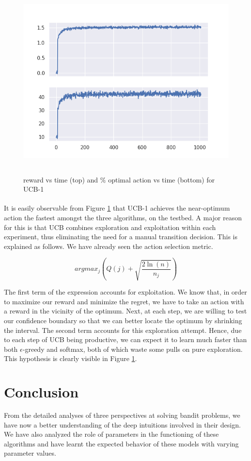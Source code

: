 \documentclass[12pt]{extarticle}
\begin{document}
\begin{figure}[H]
	\includegraphics[width=\textwidth, height=10cm]{ucb-1.png}
	\caption{reward vs time (top) and $\%$ optimal action vs time (bottom) for UCB-1}
	\label{fig:ucb-1}
\end{figure}

\paragraph{} It is easily observable from Figure \ref{fig:ucb-1} that UCB-1 achieves the near-optimum action the fastest amongst the three algorithms, on the testbed. A major reason for this is that UCB combines exploration and exploitation within each experiment, thus eliminating the need for a manual transition decision. This is explained as follows. We have already seen the action selection metric.

\begin{equation*}
argmax_j \left(Q(j) + \sqrt{\frac{2\ln(n)}{n_j}}\right)
\end{equation*}

The first term of the expression accounts for exploitation. We know that, in order to maximize our reward and minimize the regret, we have to take an action with a reward in the vicinity of the optimum. Next, at each step, we are willing to test our confidence boundary so that we can better locate the optimum by shrinking the interval. The second term accounts for this exploration attempt. Hence, due to each step of UCB being productive, we can expect it to learn much faster than both $\epsilon$-greedy and softmax, both of which waste some pulls on pure exploration. This hypothesis is clearly visible in Figure \ref{fig:ucb-1}.

\section{Conclusion}
From the detailed analyses of three perspectives at solving bandit problems, we have now a better understanding of the deep intuitions involved in their design. We have also analyzed the role of parameters in the functioning of these algorithms and have learnt the expected behavior of these models with varying parameter values.



\end{document}
